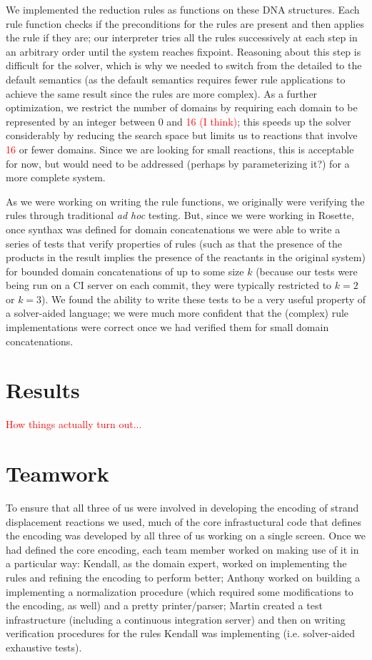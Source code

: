 \documentclass{article}
\begin{document}
We implemented the reduction rules as functions on these DNA
structures.  Each rule function checks if the preconditions for the
rules are present and then applies the rule if they are; our
interpreter tries all the rules successively at each step in an
arbitrary order until the system reaches fixpoint. Reasoning about
this step is difficult for the solver, which is why we needed to
switch from the detailed to the default semantics (as the default
semantics requires fewer rule applications to achieve the same result
since the rules are more complex). As a further optimization, we
restrict the number of domains by requiring each domain to be
represented by an integer between 0 and \textcolor{red}{16 (I think)};
this speeds up the solver considerably by reducing the search space
but limits us to reactions that involve \textcolor{red}{16} or fewer
domains. Since we are looking for small reactions, this is acceptable
for now, but would need to be addressed (perhaps by parameterizing
it?) for a more complete system.

As we were working on writing the rule functions, we originally were
verifying the rules through traditional \emph{ad hoc} testing. But,
since we were working in Rosette, once synthax was defined for domain
concatenations we were able to write a series of tests that verify
properties of rules (such as that the presence of the products in the
result implies the presence of the reactants in the original system)
for bounded domain concatenations of up to some size $k$ (because our
tests were being run on a CI server on each commit, they were
typically restricted to $k=2$ or $k=3$). We found the ability to write
these tests to be a very useful property of a solver-aided language;
we were much more confident that the (complex) rule implementations
were correct once we had verified them for small domain
concatenations.

\section{Results}

\textcolor{red}{How things actually turn out...}

\section{Teamwork}

To ensure that all three of us were involved in developing the encoding of
strand displacement reactions we used, much of the core infrastuctural code
that defines the encoding was developed by all three of us working on a single
screen. Once we had defined the core encoding, each team member worked on
making use of it in a particular way: Kendall, as the domain expert, worked
on implementing the rules and refining the encoding to perform better; Anthony
worked on building a implementing a normalization procedure (which required
some modifications to the encoding, as well) and a pretty printer/parser;
Martin created a test infrastructure (including a continuous integration server)
and then on writing verification procedures for the rules Kendall was
implementing (i.e. solver-aided exhaustive tests).
\end{document}
